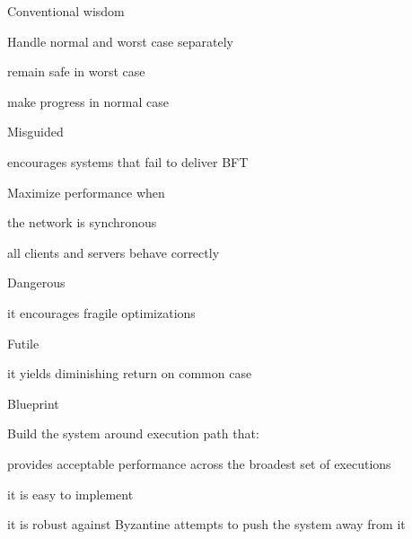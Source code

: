 \begin{frame}{Conventional wisdom}
	
\begin{overprint}
	\BIL
	\item Handle normal and worst case separately 
		\BI
		\item remain safe in worst case
		\item make progress in normal case
		\EI
	\EIL
{}
	\BIL
	\item Misguided
		\BI
		\item encourages systems that fail to deliver BFT
		\EI
	\EIL
\end{overprint}	
\bigskip
\begin{overprint}
\BIL
\item Maximize performance when
	\BI
	\item the network is synchronous 
	\item all clients and servers behave correctly
	\EI
\EIL
{}
\BIL
\item Dangerous
	\BI
	\item it encourages \alert{fragile optimizations}
	\EI
\EIL
\end{overprint}
\BIL
\item Futile
	\BI
	\item it yields \alert{diminishing return} on common case
	\EI
\EIL


\end{frame}

\begin{frame}{Blueprint}

\BIL
\item Build the system around execution path that:
\BI
\item provides acceptable performance across the broadest set of executions
\item it is easy to implement
\item it is robust against Byzantine attempts to push the system away from it
\EI
\EIL

\end{frame}	

